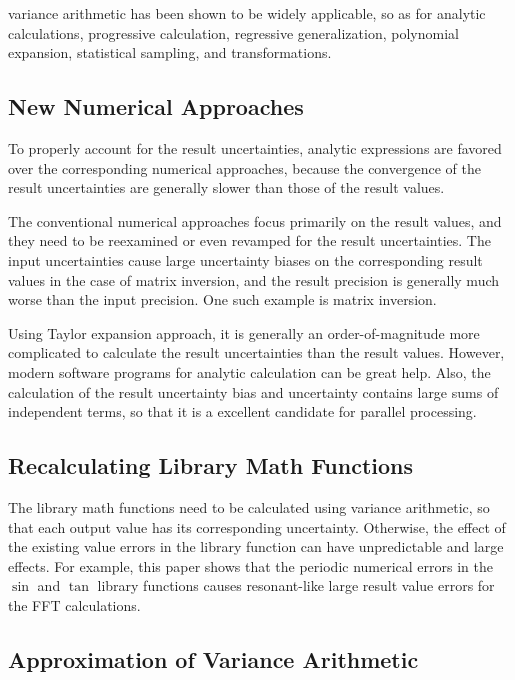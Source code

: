 \documentclass[twoside]{article}
\numberwithin{equation}{section}
\begin{document}
variance arithmetic has been shown to be widely applicable, so as for analytic calculations, progressive calculation, regressive generalization, polynomial expansion, statistical sampling, and transformations.



\subsection{New Numerical Approaches}

To properly account for the result uncertainties, analytic expressions are favored over the corresponding numerical approaches, because the convergence of the result uncertainties are generally slower than those of the result values.

The conventional numerical approaches focus primarily on the result values, and they need to be reexamined or even revamped for the result uncertainties.
The input uncertainties cause large uncertainty biases on the corresponding result values in the case of matrix inversion,  and the result precision is generally much worse than the input precision.
One such example is matrix inversion.

Using Taylor expansion approach, it is generally an order-of-magnitude more complicated to calculate the result uncertainties than the result values.
However, modern software programs for analytic calculation can be great help.
Also, the calculation of the result uncertainty bias and uncertainty contains large sums of independent terms, so that it is a excellent candidate for parallel processing.


\subsection{Recalculating Library Math Functions}

The library math functions need to be calculated using variance arithmetic, so that each output value has its corresponding uncertainty.
Otherwise, the effect of the existing value errors in the library function can have unpredictable and large effects.
For example, this paper shows that the periodic numerical errors in the $\sin$ and $\tan$ library functions causes resonant-like large result value errors for the FFT calculations.


\subsection{Approximation of Variance Arithmetic}
\end{document}
